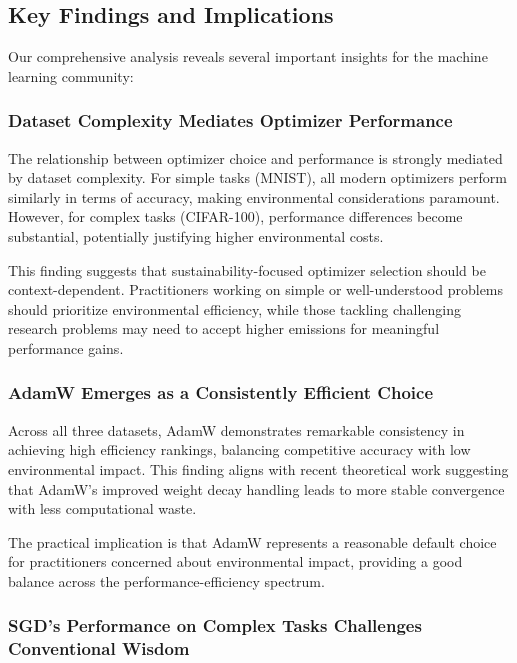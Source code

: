 \documentclass[conference]{IEEEtran}
\begin{document}
\subsection{Key Findings and Implications}

Our comprehensive analysis reveals several important insights for the machine learning community:

\subsubsection{Dataset Complexity Mediates Optimizer Performance}

The relationship between optimizer choice and performance is strongly mediated by dataset complexity. For simple tasks (MNIST), all modern optimizers perform similarly in terms of accuracy, making environmental considerations paramount. However, for complex tasks (CIFAR-100), performance differences become substantial, potentially justifying higher environmental costs.

This finding suggests that sustainability-focused optimizer selection should be context-dependent. Practitioners working on simple or well-understood problems should prioritize environmental efficiency, while those tackling challenging research problems may need to accept higher emissions for meaningful performance gains.

\subsubsection{AdamW Emerges as a Consistently Efficient Choice}

Across all three datasets, AdamW demonstrates remarkable consistency in achieving high efficiency rankings, balancing competitive accuracy with low environmental impact. This finding aligns with recent theoretical work suggesting that AdamW's improved weight decay handling leads to more stable convergence with less computational waste.

The practical implication is that AdamW represents a reasonable default choice for practitioners concerned about environmental impact, providing a good balance across the performance-efficiency spectrum.

\subsubsection{SGD's Performance on Complex Tasks Challenges Conventional Wisdom}
\end{document}

